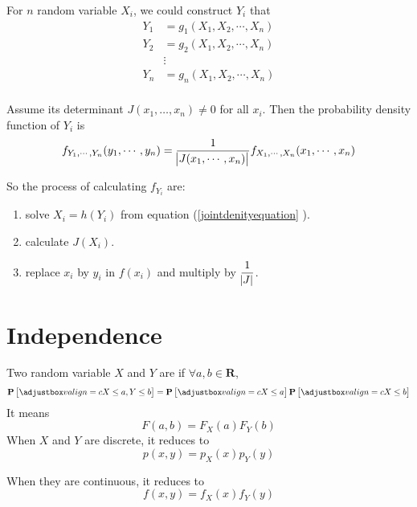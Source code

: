 For $n$ random variable $X_i$, we could construct $Y_i$ that
\begin{equation}\label{jointdenityequation}
    \begin{aligned}
        Y_1 &= g_1 (X_1, X_2, \cdots, X_n) \\
        Y_2 &= g_2 (X_1, X_2, \cdots, X_n) \\
        & \vdots \\
        Y_n &= g_n (X_1, X_2, \cdots, X_n) \\
    \end{aligned}
\end{equation}

Assume its  determinant $J(x_1, \dots, x_n) \neq 0$ for all $x_i$. Then the probability density function of $Y_i$ is 
\begin{equation}
    f_{Y_1, \cdots, Y_n}(y_1, \cdots, y_n) = \frac{1}{\abs{J(x_1, \cdots, x_n)}} f_{X_1, \cdots, X_n}(x_1, \cdots , x_n)
\end{equation}

So the process of calculating $f_{Y_i}$ are:
\begin{enumerate}
    \item solve $X_i = h(Y_i)$ from equation (\ref{jointdenityequation} ).
    \item calculate $J(X_i)$.
    \item replace $x_i$ by $y_i$ in $f(x_i)$ and multiply by $\displaystyle \frac{1}{\abs{J}}$.
\end{enumerate}


\section{Independence}

\begin{definition}
    Two random variable $X$ and $Y$ are  if $\forall a,b \in \mathbf{R}$,
    \begin{equation}
        \probability{ X \leq a , Y \leq b } = \probability{ X \leq a } \probability{ X \leq b }
    \end{equation}
    It means
    \begin{equation}
        F(a,b) = F_X(a) F_Y(b)
    \end{equation}
    When $X$ and $Y$ are discrete, it reduces to
    \begin{equation}
        p(x,y) = p_X(x) p_Y(y)
    \end{equation}
    
    When they are continuous, it reduces to
    \begin{equation}
        f(x,y)=f_X(x) f_Y(y)
    \end{equation}
\end{definition}

